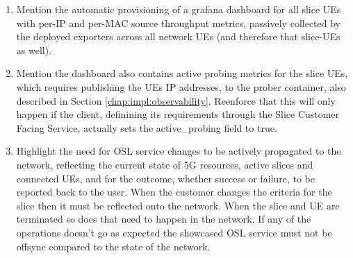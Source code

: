 {\begin{enumerate}
    \item Mention the automatic provisioning of a grafana dashboard for all slice UEs with per-IP and per-MAC source throughput metrics, passively collected by the deployed exporters across all network UEs (and therefore that slice-UEs as well).
    \item Mention the dashboard also contains active probing metrics for the slice UEs, which requires publishing the UEs IP addresses, to the prober container, also described in Section \ref{chap:impl:observability}. Reenforce that this will only happen if the client, definining its requirements through the Slice Customer Facing Service, actually sets the active\_probing field to true. 
    \item Highlight the need for OSL service changes to be actively propagated to the network, reflecting the current state of 5G resources, active slices and connected UEs, and for the outcome, whether success or failure, to be reported back to the user. When the customer changes the criteria for the slice then it must be reflected onto the network. When the slice and UE are terminated so does that need to happen in the network. If any of the operations doesn't go as expected the showcased OSL service must not be offsync compared to the state of the network.
\end{enumerate}}